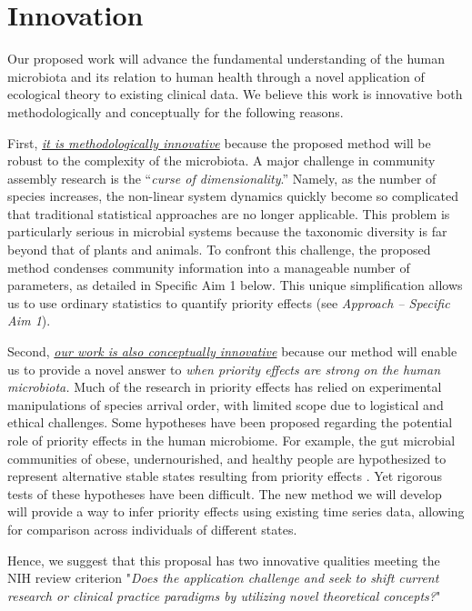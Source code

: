\documentclass[12pt, class=article, crop=false]{standalone}
\begin{document}
\section{Innovation}
Our proposed work will advance the fundamental understanding of the human microbiota and its relation to human health through a novel application of ecological theory to existing clinical data.
We believe this work is innovative both methodologically and conceptually for the following reasons.

First, \ul{\emph{it is methodologically innovative}} because the proposed method will be robust to the complexity of the microbiota.
A major challenge in community assembly research is the ``\textit{curse of dimensionality}.''
Namely, as the number of species increases, the non-linear system dynamics quickly become so complicated that traditional statistical approaches are no longer applicable.
This problem is particularly serious in microbial systems because the taxonomic diversity is far beyond that of plants and animals.
To confront this challenge, the proposed method condenses community information into a manageable number of parameters, as detailed in Specific Aim 1 below. 
This unique simplification allows us to use ordinary statistics to quantify priority effects (see \textit{Approach -- Specific Aim 1}).

Second, \ul{\emph{our work is also conceptually innovative}} because our method will enable us to provide a novel answer to \textit{when priority effects are strong on the human microbiota.}
Much of the research in priority effects has relied on experimental manipulations of species arrival order, with limited scope due to logistical and ethical challenges.
Some hypotheses have been proposed regarding the potential role of priority effects in the human microbiome.
For example, the gut microbial communities of obese, undernourished, and healthy people are hypothesized to represent alternative stable states resulting from priority effects \citep{fierer_animalcules_2012}.
Yet rigorous tests of these hypotheses have been difficult. 
The new method we will develop will provide a way to infer priority effects using existing time series data, allowing for comparison across individuals of different states.

Hence, we suggest that this proposal has two innovative qualities meeting the NIH review criterion "\emph{Does the application challenge and seek to shift current research or clinical practice paradigms by utilizing novel theoretical concepts?}"
\end{document}
